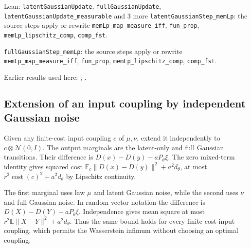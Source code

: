 \documentclass[11pt,a4paper]{report}
\begin{document}
\begin{leanbox}{Lean: \texttt{latentGaussianUpdate}, \texttt{fullGaussianUpdate}, \texttt{latentGaussianUpdate\_\allowbreak{}measurable} and 3 more}
\texttt{latent\allowbreak{}Gaussian\allowbreak{}Step\_\allowbreak{}mem\allowbreak{}Lp}: the source steps apply or rewrite \texttt{mem\allowbreak{}Lp\_\allowbreak{}map\_\allowbreak{}measure\_\allowbreak{}iff}, \texttt{fun\_\allowbreak{}prop}, \texttt{mem\allowbreak{}Lp\_\allowbreak{}lipschitz\_\allowbreak{}comp}, \texttt{comp\_\allowbreak{}fst}.



\texttt{full\allowbreak{}Gaussian\allowbreak{}Step\_\allowbreak{}mem\allowbreak{}Lp}: the source steps apply or rewrite \texttt{mem\allowbreak{}Lp\_\allowbreak{}map\_\allowbreak{}measure\_\allowbreak{}iff}, \texttt{fun\_\allowbreak{}prop}, \texttt{mem\allowbreak{}Lp\_\allowbreak{}lipschitz\_\allowbreak{}comp}, \texttt{comp\_\allowbreak{}fst}.
\end{leanbox}


Earlier results used here: \cite[Section~3.33.5]{LangevinLean2026ULASC}; \cite[Section~3.1.1]{LangevinLean2026IPLA}.
\subsection{\texorpdfstring{Extension of an input coupling by independent Gaussian noise}{Extension of an input coupling by independent Gaussian noise}}
\label{report-step-ProximalLangevin-MYPGDTransport-lean-3}


Given any finite-cost input coupling \(c\) of \(\mu,\nu\), extend it independently to \(c\otimes\mathcal N(0,I)\). The output marginals are the latent-only and full Gaussian transitions. Their difference is \(D(x)-D(y)-aP_\theta\xi\). The zero mixed-term identity gives squared cost \(\mathbb E_c\|D(x)-D(y)\|^2+a^2d_\theta\), at most \(r^2\operatorname{cost}(c)^2+a^2d_\theta\) by Lipschitz continuity.



The first marginal uses law \(\mu\) and latent Gaussian noise, while the second uses \(\nu\) and full Gaussian noise. In random-vector notation the difference is \(D(X)-D(Y)-aP_\theta\xi\). Independence gives mean square at most \(r^2\mathbb E\|X-Y\|^2+a^2d_\theta\). Thus the same bound holds for every finite-cost input coupling, which permits the Wasserstein infimum without choosing an optimal coupling.
\end{document}

